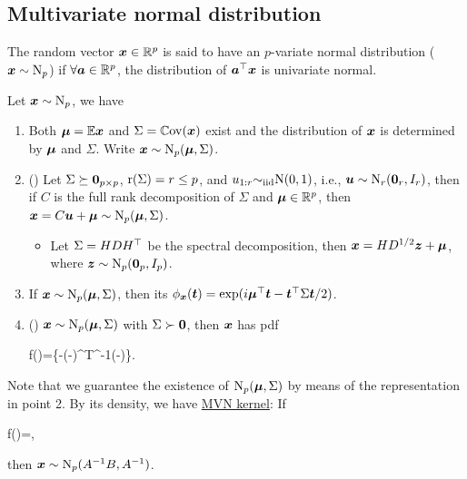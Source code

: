 \documentclass[10pt,a4paper]{book}
\begin{document}
\subsection{Multivariate normal distribution}\label{sec:mult_normal}
\begin{defbox}
	\begin{definition}\label{def:oridef_multi_normal}
		The random vector ${\boldsymbol x}\in\mathbb R^p$ is said to have an $p$-variate normal distribution (${\boldsymbol x}\sim\mathrm{N}_p$) if $\forall {\boldsymbol a}\in\mathbb R^p$, the distribution of ${\boldsymbol a}^\top{\boldsymbol x}$ is univariate normal.  
	\end{definition}
\end{defbox}
\begin{thmbox}
	\begin{theorem}\label{thm:multi_normal}
		Let ${\boldsymbol x}\sim\mathrm{N}_p$, we have
		\begin{enumerate}
			\item Both ${\boldsymbol\mu}=\mathbb E{\boldsymbol x}$ and $\Sigma=\mathbb{C}\mathrm{ov}({\boldsymbol x})$ exist and the distribution of ${\boldsymbol x}$ is determined by ${\boldsymbol\mu}$ and $\Sigma$. Write ${\boldsymbol x}\sim\mathrm{N}_p({\boldsymbol\mu},\Sigma)$. 
			\item () Let $\Sigma\succeq{\boldsymbol 0}_{p\times p}$, $\mathrm{r}(\Sigma)=r\leq p$, and $u_{1:r}{\sim}_{\mathrm{iid}}\mathrm{N}(0,1)$, i.e., ${\boldsymbol u}\sim\mathrm{N}_r({\boldsymbol 0}_r,I_r)$, then if $C$ is the full rank decomposition of $\Sigma$ and ${\boldsymbol\mu}\in\mathbb R^p$, then ${\boldsymbol x}=C{\boldsymbol u}+{\boldsymbol\mu}\sim\mathrm{N}_p({\boldsymbol\mu},\Sigma)$.  
			\begin{itemize}
				\item Let $\Sigma=HDH^\top$ be the spectral
				decomposition, then ${\boldsymbol x}=HD^{1/2}{\boldsymbol z}+{\boldsymbol\mu}$, where ${\boldsymbol z}\sim\mathrm{N}_p({\boldsymbol 0}_p,I_p)$.
			\end{itemize}
			\item If ${\boldsymbol x}\sim\mathrm{N}_p({\boldsymbol\mu},\Sigma)$, then its  $\phi_{\boldsymbol x}({\boldsymbol t})=\exp(i{\boldsymbol\mu}^\top{\boldsymbol t}-{\boldsymbol t}^\top\Sigma{\boldsymbol t}/2)$.
			\item () ${\boldsymbol x}\sim\mathrm{N}_p({\boldsymbol\mu},\Sigma)$ with $\Sigma\succ {\boldsymbol 0}$, then ${\boldsymbol x}$ has pdf
			\begin{sequation}\label{eq:mult_normal_density}
				f()=\exp\left\{-(-\boldsymbol{\mu})^{T}{\Sigma}^{-1}(-\boldsymbol{\mu})\right\}.
			\end{sequation}
		\end{enumerate}
	\end{theorem}
\end{thmbox}
Note that we guarantee the existence of $\mathrm{N}_p({\boldsymbol\mu},\Sigma)$ by means of the representation in point 2. By its density, we have \underline{MVN kernel}: If
\begin{sequation*}
	f(\x)\propto \exp{}=\exp{},
\end{sequation*}
then ${\boldsymbol x}\sim\mathrm{N}_p(A^{-1}B,A^{-1})$.
\end{document}
